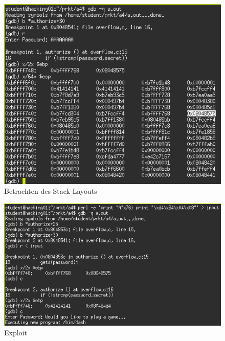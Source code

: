 \documentclass[11pt,a4paper]{article}
\begin{document}
\begin{figure}[h!]
  \caption{Betrachten des Stack-Layouts}
  \label{a4_2}
  \centering
    \includegraphics[scale=0.5]{a4_2.png}
\end{figure}
\begin{figure}[h!]
  \caption{Exploit}
  \label{a4_3}
  \centering
    \includegraphics[scale=0.5]{a4_3.png}
\end{figure}
\end{document}
